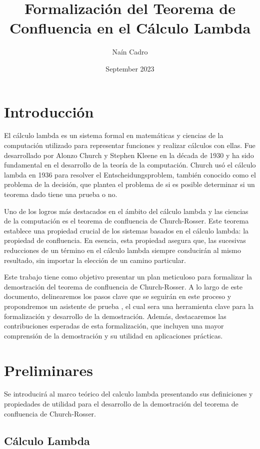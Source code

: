 \documentclass{article}
\title{Formalización del Teorema de Confluencia en el Cálculo Lambda }
\author{ Naín Cadro}
\date{September 2023}
\begin{document}
\maketitle


\section{ Introducción}
El cálculo lambda es un sistema formal en matemáticas y ciencias de la computación utilizado para representar funciones y realizar cálculos con ellas. Fue desarrollado por Alonzo Church y Stephen Kleene en la década de 1930 y ha sido fundamental en el desarrollo de la teoría de la computación. Church usó el cálculo lambda en 1936 para resolver el Entscheidungsproblem, también conocido como el problema de la decisión, que plantea el problema de si es posible determinar si un teorema dado tiene una prueba o no.

Uno de los logros más destacados en el ámbito del cálculo lambda y las ciencias de la computación es el teorema de confluencia de Church-Rosser. Este teorema establece una propiedad crucial de los sistemas basados en el cálculo lambda: la propiedad de confluencia. En esencia, esta propiedad asegura que,  las sucesivas reducciones de un término en el cálculo lambda siempre conducirán al mismo resultado, sin importar la elección de un camino particular.

Este trabajo tiene como objetivo presentar un plan meticuloso para formalizar la demostración del teorema de confluencia de Church-Rosser. A lo largo de este documento, delinearemos los pasos clave que se seguirán en este proceso y propondremos un asistente de prueba , el cual sera una herramienta clave para la formalización y desarrollo de la demostración. Además, destacaremos las contribuciones esperadas de esta formalización, que incluyen una mayor comprensión de la demostración y su utilidad en aplicaciones prácticas.

\section{ Preliminares}
Se introducirá al marco teórico del calculo lambda presentando sus definiciones y propiedades de utilidad para el desarrollo de la demostración del teorema de confluencia de Church-Rosser.

\subsection{Cálculo Lambda}
\end{document}
